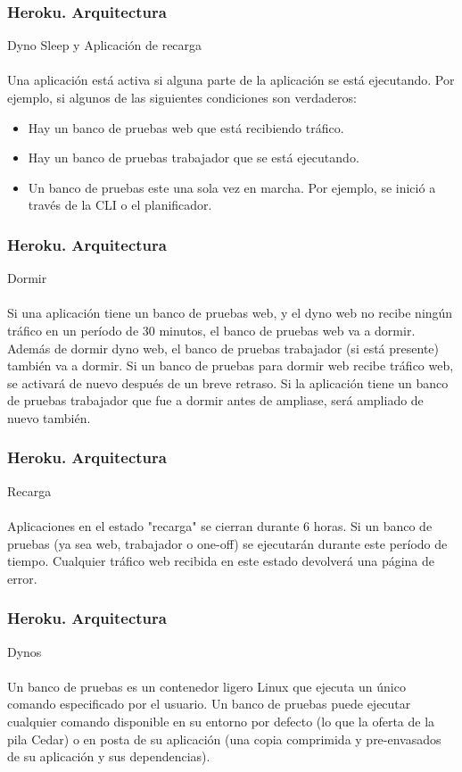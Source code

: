 \documentclass{beamer}
\begin{document}
\begin{frame}
\frametitle{Heroku. Arquitectura}
Dyno Sleep y Aplicación de recarga\\ \ \\
Una aplicación está activa si alguna parte de la aplicación se está ejecutando. Por ejemplo, si algunos de las siguientes condiciones son verdaderos:
\begin{itemize}
\item Hay un banco de pruebas web que está recibiendo tráfico.
\item Hay un banco de pruebas trabajador que se está ejecutando. 
\item Un banco de pruebas este una sola vez en marcha. Por ejemplo, se inició a través de la CLI o el planificador.
\end{itemize}
\end{frame}


\begin{frame}
	\frametitle{Heroku. Arquitectura}
	Dormir\\ \ \\
	Si una aplicación tiene un banco de pruebas web, y el dyno web no recibe ningún tráfico en un período de 30 minutos, el banco de pruebas web va a dormir. Además de dormir dyno web, el banco de pruebas trabajador (si está presente) también va a dormir. Si un banco de pruebas para dormir web recibe tráfico web, se activará de nuevo después de un breve retraso. Si la aplicación tiene un banco de pruebas trabajador que fue a dormir antes de ampliase, será ampliado de nuevo también.
	

\end{frame}

\begin{frame}
	\frametitle{Heroku. Arquitectura}
	Recarga\\ \ \\
Aplicaciones en el estado "recarga" se cierran durante 6 horas. Si un banco de pruebas (ya sea web, trabajador o one-off) se ejecutarán durante este período de tiempo. Cualquier tráfico web recibida en este estado devolverá una página de error.
\end{frame}

\begin{frame}
	\frametitle{Heroku. Arquitectura}
	Dynos\\ \ \\
	Un banco de pruebas es un contenedor ligero Linux que ejecuta un único comando especificado por el usuario. Un banco de pruebas puede ejecutar cualquier comando disponible en su entorno por defecto (lo que la oferta de la pila Cedar) o en posta de su aplicación (una copia comprimida y pre-envasados de su aplicación y sus dependencias). 
\end{frame}
\end{document}
